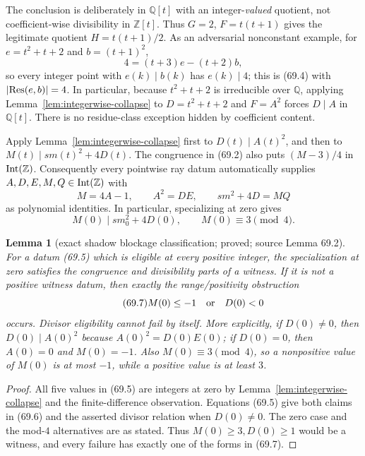 \documentclass[10pt,reqno]{amsart}
\newtheorem{lemma}[theorem]{Lemma}
\theoremstyle{definition}
\newcommand{\1}{\mathbf 1}
\begin{document}
The conclusion is deliberately in $\mathbb Q[t]$ with an integer-\emph{valued}
quotient, not coefficient-wise divisibility in $\mathbb Z[t]$.  Thus $G=2$,
$F=t(t+1)$ gives the legitimate quotient $H=t(t+1)/2$.  As an adversarial
nonconstant example, for $e=t^2+t+2$ and $b=(t+1)^2$,
\[
        4=(t+3)e-(t+2)b,
\]
so every integer point with $e(k)\mid b(k)$ has $e(k)\mid4$; this is (69.4)
with $|{\rm Res}(e,b)|=4$.  In particular, because $t^2+t+2$ is irreducible
over $\mathbb Q$, applying Lemma~\ref{lem:integerwise-collapse} to
$D=t^2+t+2$ and $F=A^2$ forces $D\mid A$ in $\mathbb Q[t]$.  There is no
residue-class exception hidden by coefficient content.

Apply Lemma~\ref{lem:integerwise-collapse} first to
$D(t)\mid A(t)^2$, and then to
$M(t)\mid s m(t)^2+4D(t)$.  The congruence in (69.2) also puts
$(M-3)/4$ in ${\rm Int}(\mathbb Z)$.  Consequently every pointwise ray
datum automatically supplies $A,D,E,M,Q\in{\rm Int}(\mathbb Z)$ with
\begin{equation}\tag{69.5}
 M=4A-1,\qquad A^2=DE,\qquad s m^2+4D=MQ
\end{equation}
as polynomial identities.  In particular, specializing at zero gives
\begin{equation}\tag{69.6}
 M(0)\mid s m_0^2+4D(0),\qquad M(0)\equiv3\pmod4.
\end{equation}

\begin{lemma}[exact shadow blockage classification; proved; source Lemma 69.2]
\label{lem:shadow-blockage}
For a datum (69.5) which is eligible at every positive integer, the
specialization at zero satisfies the congruence and divisibility parts of a
witness.  If it is not a positive witness datum, then exactly the
range/positivity obstruction
\begin{equation}\tag{69.7}
                    M(0)\leq-1\quad\hbox{or}\quad D(0)<0
\end{equation}
occurs.  Divisor eligibility cannot fail by itself.  More explicitly, if
$D(0)\ne0$, then $D(0)\mid A(0)^2$ because
$A(0)^2=D(0)E(0)$; if $D(0)=0$, then $A(0)=0$ and $M(0)=-1$.  Also
$M(0)\equiv3\pmod4$, so a nonpositive value of $M(0)$ is at most $-1$,
while a positive value is at least $3$.
\end{lemma}
\begin{proof}
All five values in (69.5) are integers at zero by
Lemma~\ref{lem:integerwise-collapse} and the finite-difference observation.
Equations (69.5) give both claims in (69.6) and the asserted divisor relation
when $D(0)\ne0$.  The zero case and the mod-$4$ alternatives are as stated.
Thus $M(0)\geq3,D(0)\geq1$ would be a witness, and every failure has exactly
one of the forms in (69.7).
\end{proof}
\end{document}
